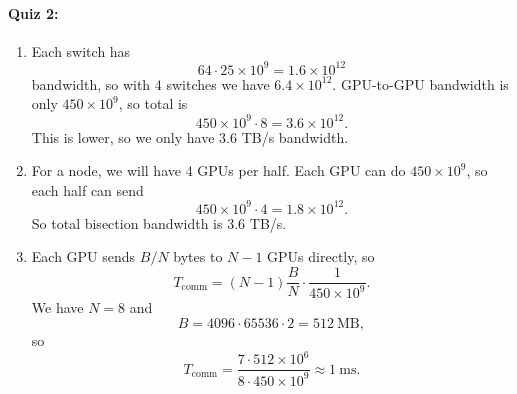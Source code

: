 \documentclass[11pt]{article}
\newcommand{\B}{B}
\newcommand{\ms}{\mathrm{ms}}
\newcommand{\quizbreak}{\Needspace{6\baselineskip}}
\begin{document}
\quizbreak
\paragraph{Quiz 2:}
\begin{enumerate}
  \item Each switch has
  \[
    64\cdot 25\times 10^9=1.6\times 10^{12}
  \]
  bandwidth, so with $4$ switches we have $6.4\times 10^{12}$. GPU-to-GPU bandwidth is only $450\times 10^9$, so total is
  \[
    450\times 10^9\cdot 8=3.6\times 10^{12}.
  \]
  This is lower, so we only have $3.6$ TB/s bandwidth.

  \item For a node, we will have $4$ GPUs per half. Each GPU can do $450\times 10^9$, so each half can send
  \[
    450\times 10^9\cdot 4 = 1.8\times 10^{12}.
  \]
  So total bisection bandwidth is $3.6$ TB/s.

  \item Each GPU sends $\B/N$ bytes to $N-1$ GPUs directly, so
  \[
    T_{\mathrm{comm}}
    =
    (N-1)\frac{\B}{N}\cdot \frac{1}{450\times 10^9}.
  \]
  We have $N=8$ and
  \[
    \B=4096\cdot 65536\cdot 2=512\ \mathrm{MB},
  \]
  so
  \[
    T_{\mathrm{comm}}
    =
    \frac{7\cdot 512\times 10^6}{8\cdot 450\times 10^9}
    \approx 1\ \ms.
  \]
\end{enumerate}

\quizbreak
\end{document}
